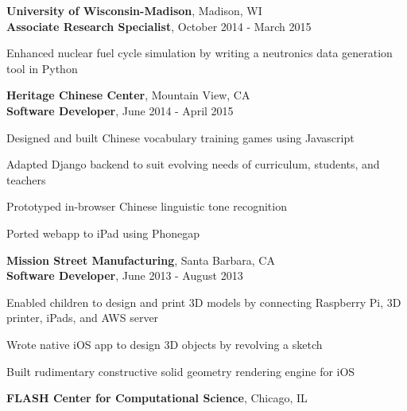 \textbf{University of Wisconsin-Madison}, Madison, WI \\
\textbf{Associate Research Specialist}, October 2014 - March 2015
\begin{tightlist}

  \item Enhanced nuclear fuel cycle simulation by writing a neutronics
  data generation tool in Python

\end{tightlist}
\textbf{Heritage Chinese Center}, Mountain View, CA \\
\textbf{Software Developer}, June 2014 - April 2015
\begin{tightlist}

  \item Designed and built Chinese vocabulary training games using
  Javascript

  \item Adapted Django backend to suit evolving needs of curriculum,
  students, and teachers

  \item Prototyped in-browser Chinese linguistic tone recognition


  \item Ported webapp to iPad using Phonegap

\end{tightlist}
\textbf{Mission Street Manufacturing}, Santa Barbara, CA \\
\textbf{Software Developer}, June 2013 - August 2013
\begin{tightlist}

  \item Enabled children to design and print 3D models by connecting
  Raspberry Pi, 3D printer, iPads, and AWS server


  \item Wrote native iOS app to design 3D objects by revolving a sketch

  \item Built rudimentary constructive solid geometry rendering engine for iOS

\end{tightlist}
\textbf{FLASH Center for Computational Science}, Chicago, IL \\
